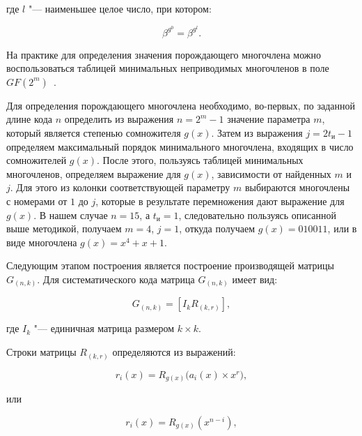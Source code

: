 \begin{ESKDexplanation}
\item[где ] $l$ "--- наименьшее целое число, при котором:
\end{ESKDexplanation}

\begin{equation*}
  \beta^{g^0} = \beta^{g^l}.
\end{equation*}

На практике для определения значения порождающего многочлена можно
воспользоваться таблицей минимальных неприводимых многочленов в поле
$GF(2^m)$~\cite{Kuznetsov}.

Для определения порождающего многочлена необходимо, во-первых, по
заданной длине кода $n$ определить из выражения $n = 2^m - 1$ значение
параметра $m$, который является степенью сомножителя $g(x)$. Затем из
выражения $j = 2t_{\text{и}} - 1$ определяем максимальный порядок
минимального многочлена, входящих в число сомножителей $g(x)$. После
этого, пользуясь таблицей минимальных многочленов, определяем
выражение для $g(x)$, зависимости от найденных $m$ и $j$. Для этого из
колонки соответствующей параметру $m$ выбираются многочлены с номерами
от $1$ до $j$, которые в результате перемножения дают выражение для
$g(x)$. В нашем случае $n = 15$, а $t_{\text{и}} = 1$, следовательно
пользуясь описанной выше методикой, получаем $m = 4$, $j = 1$, откуда
получаем $g(x)=010011$, или в виде многочлена $g(x)=x^4 + x + 1$.

Следующим этапом построения является построение производящей матрицы
$G_{(n,k)}$. Для систематического кода матрица $G_{(n, k)}$ имеет вид:

\begin{equation*}
  G_{(n,k)} = \left[I_k R_{(k, r)} \right],
\end{equation*}

\begin{ESKDexplanation}
\item[где ] $I_k$ "--- единичная матрица размером $k \times k$.
\end{ESKDexplanation}

Строки матрицы $R_{(k, r)}$ определяются из выражений:

\begin{equation}
\label{r_i(x)}
r_i(x) = R_{g(x)}\bigl(a_i(x) \times x^r \bigr),
\end{equation}

или

\begin{equation*}
r_i(x) = R_{g(x)}\left(x^{n-i} \right),
\end{equation*}

